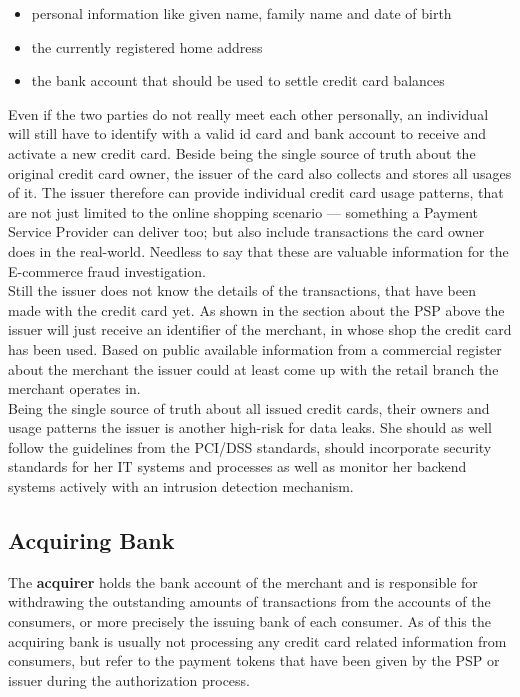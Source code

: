 \begin{itemize}
		\item personal information like given name, family name and date of birth
		\item the currently registered home address
		\item the bank account that should be used to settle credit card balances
\end{itemize}

Even if the two parties do not really meet each other personally, an individual will still have to identify with a valid id card and bank account to receive and activate a new credit card. Beside being the single source of truth about the original credit card owner, the issuer of the card also collects and stores all  usages of it. The issuer therefore can provide individual credit card usage patterns, that are not just limited to the online shopping scenario --- something a Payment Service Provider can deliver too; but also include transactions the card owner does in the real-world. Needless to say that these are valuable information for the E-commerce fraud investigation. \\

Still the issuer does not know the details of the transactions, that have been made with the credit card yet. As shown in the section about the \gls{PSP} above the issuer will just receive an identifier of the merchant, in whose shop the credit card has been used. Based on public available information from a commercial register about the merchant the issuer could at least come up with the retail branch the merchant operates in. \\

Being the single source of truth about all issued credit cards, their owners and usage patterns the issuer is another high-risk for data leaks. She should as well follow the guidelines from the PCI/DSS standards, should incorporate security standards for her IT systems and processes as well as monitor her backend systems actively with an intrusion detection mechanism.


\subsection{Acquiring Bank}
\label{subsec:stakeholder_acquirer}

The \textbf{acquirer} holds the bank account of the merchant and is responsible for withdrawing the outstanding amounts of transactions from the accounts of the consumers, or more precisely the issuing bank of each consumer. As of this the acquiring bank is usually not processing any credit card related information from consumers, but refer to the payment tokens that have been given by the \gls{PSP} or issuer during the authorization process. \\

